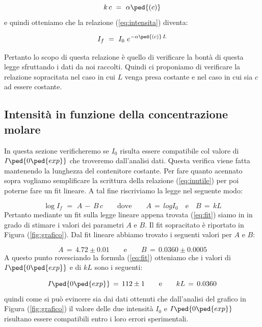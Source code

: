\begin{equation}
	k\,c \,\,=\,\, \alpha\ped{(c)}
\end{equation}
%
e quindi otteniamo che la relazione (\ref{eq:intensita}) diventa:

\begin{equation}
	I_f \,\,=\,\, I_0 \,\, e^{-\alpha\ped{(c)}\,L}
	\label{eq:inutile}
\end{equation}
%

Pertanto lo scopo di questa relazione è quello di verificare la bontà di questa legge sfruttando i dati da noi raccolti.
Quindi ci proponiamo di verificare la relazione sopracitata nel caso in cui $L$ venga presa costante e nel caso in cui sia $c$ ad essere costante.

\subsection{Intensità in funzione della concentrazione molare}

In questa sezione verificheremo se $I_0$ risulta essere compatibile col valore di $I\ped{0\ped{exp}}$ che troveremo dall'analisi dati. Questa verifica viene fatta mantenendo la lunghezza del contenitore costante.
Per fare quanto acennato sopra vogliamo semplificare la scrittura della relazione (\ref{eq:inutile}) per poi poterne fare un fit lineare. A tal fine riscriviamo la legge nel seguente modo:

\begin{equation}
	\log{I_f} \,\,=\,\, A \,-\, B \, c \qquad \text{dove} \qquad A \,=\, log{I_0} \quad \text{e} \quad B\,=\, kL
	\label{eq:fit}
\end{equation}
%
Pertanto mediante un fit sulla legge lineare appena trovata (\ref{eq:fit}) siamo in in grado di stimare i valori dei parametri
$A$ e $B$. Il fit sopracitato è riportato in Figura (\ref{fig:grafico}). Dal fit lineare abbiamo trovato i seguenti valori per $A$ e $B$:

\begin{equation*}
	A \,=\, 4.72 \pm 0.01 \qquad \text{e} \qquad B \,=\, 0.0360 \pm 0.0005
\end{equation*}
%
A questo punto rovesciando la formula (\ref{eq:fit}) otteniamo che i valori di $I\ped{0\ped{exp}}$ e di $kL$ sono i seguenti:

\begin{equation}
	I\ped{0\ped{exp}} \,=\, 112 \pm 1 \qquad \text{e} \qquad kL \,=\, 0.0360
\end{equation}
%
quindi come si può evincere sia dai dati ottenuti che dall'analisi del grafico in Figura (\ref{fig:grafico}) il valore delle due intensità $I_0$ e $I\ped{0\ped{exp}}$  risultano essere compatibili entro i loro errori sperimentali.

